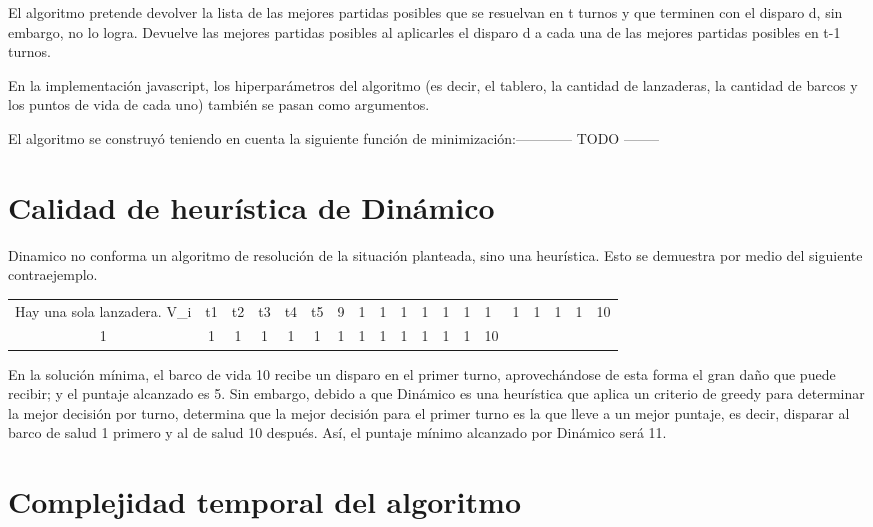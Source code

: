 \documentclass{article}
\begin{document}
El algoritmo pretende devolver la lista de las mejores partidas posibles que se resuelvan en t turnos y que terminen con el disparo d, sin embargo, no lo logra. Devuelve las mejores partidas posibles al aplicarles el disparo d a cada una de las mejores partidas posibles en t-1 turnos.

En la implementación javascript, los hiperparámetros del algoritmo (es decir, el tablero, la cantidad de lanzaderas, la cantidad de barcos y los puntos de vida de cada uno) también se pasan como argumentos.

El algoritmo se construyó teniendo en cuenta la siguiente función de minimización:------------ TODO --------

\section{Calidad de heurística de Dinámico}

Dinamico no conforma un algoritmo de resolución de la situación planteada, sino una heurística. Esto se demuestra por medio del siguiente contraejemplo.

\begin{center}
\begin{tabular}{ c | c c c c c}
Hay una sola lanzadera.
\hline
V_i & t1 & t2 & t3 & t4 & t5
    &  9 &  1 &  1 &  1 &  1 &  1 & 1 &  1 &  1 &  1 &  1 & 1  & 10 \\
1     &  1 &  1 &  1 &  1 &  1 &  1 & 1 &  1 &  1 &  1 &  1 & 1  & 10
\end{tabular}
\end{center}

En la solución mínima, el barco de vida 10 recibe un disparo en el primer turno, aprovechándose de esta forma el gran daño que puede recibir; y el puntaje alcanzado es 5. Sin embargo, debido a que Dinámico es una heurística que aplica un criterio de greedy para determinar la mejor decisión por turno, determina que la mejor decisión para el primer turno es la que lleve a un mejor puntaje, es decir, disparar al barco de salud 1 primero y al de salud 10 después. Así, el puntaje mínimo alcanzado por Dinámico será 11.

\section{Complejidad temporal del algoritmo}
\end{document}
